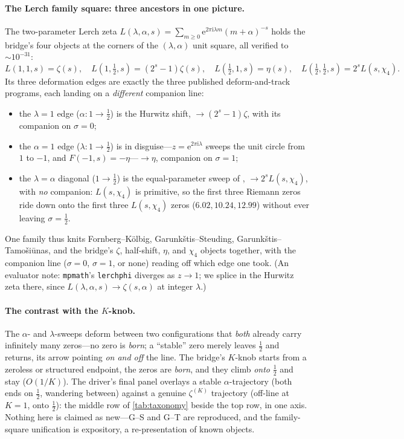 \documentclass[11pt]{article}
\theoremstyle{definition}
\newcommand{\eu}{\mathrm{e}}
\newcommand{\iu}{\mathrm{i}}
\begin{document}
\paragraph{The Lerch family square: three ancestors in one picture.}
The two-parameter Lerch zeta $L(\lambda,\alpha,s)=\sum_{m\ge0}\eu^{2\pi\iu\lambda
m}(m+\alpha)^{-s}$ holds the bridge's four objects at the corners of the
$(\lambda,\alpha)$ unit square, all verified to $\sim10^{-31}$:
\begin{equation}\label{eq:lerchcorners}
  L(1,1,s)=\zeta(s),\quad
  L(1,\tfrac12,s)=(2^{s}-1)\zeta(s),\quad
  L(\tfrac12,1,s)=\eta(s),\quad
  L(\tfrac12,\tfrac12,s)=2^{s}L(s,\chi_4).
\end{equation}
Its three deformation edges are exactly the three published deform-and-track
programs, each landing on a \emph{different} companion line:
\begin{itemize}[leftmargin=1.4em]
\item the $\lambda=1$ edge ($\alpha:1\to\tfrac12$) is the \citet{GarunkstisSteuding2007}
  Hurwitz shift, $\to(2^{s}-1)\zeta$, with its companion on $\sigma=0$;
\item the $\alpha=1$ edge ($\lambda:1\to\tfrac12$) is \citet{FornbergKolbig1975} in
  disguise---$z=\eu^{2\pi\iu\lambda}$ sweeps the unit circle from $1$ to $-1$, and
  $F(-1,s)=-\eta$---$\to\eta$, companion on $\sigma=1$;
\item the $\lambda=\alpha$ diagonal ($1\to\tfrac12$) is the equal-parameter sweep of
  \citet{GarunkstisTamosiunas2017}, $\to2^{s}L(s,\chi_4)$, with \emph{no} companion:
  $L(s,\chi_4)$ is primitive, so the first three Riemann zeros ride down onto the
  first three $L(s,\chi_4)$ zeros ($6.02,10.24,12.99$) without ever leaving
  $\sigma=\tfrac12$.
\end{itemize}
One family thus knits Fornberg--K\"olbig, Garunk\v{s}tis--Steuding,
Garunk\v{s}tis--Tamo\v{s}i\=unas, and the bridge's $\zeta$, half-shift, $\eta$, and
$\chi_4$ objects together, with the companion line ($\sigma=0$, $\sigma=1$, or none)
reading off which edge one took. (An evaluator note: \texttt{mpmath}'s
\texttt{lerchphi} diverges as $z\to1$; we splice in the Hurwitz zeta there, since
$L(\lambda,\alpha,s)\to\zeta(s,\alpha)$ at integer $\lambda$.)

\paragraph{The contrast with the $K$-knob.}
The $\alpha$- and $\lambda$-sweeps deform between two configurations that \emph{both}
already carry infinitely many zeros---no zero is \emph{born}; a ``stable'' zero merely
leaves $\tfrac12$ and returns, its arrow pointing \emph{on and off} the line. The
bridge's $K$-knob starts from a zeroless or structured endpoint, the zeros are
\emph{born}, and they climb \emph{onto} $\tfrac12$ and stay ($O(1/K)$). The driver's
final panel overlays a stable $\alpha$-trajectory (both ends on $\tfrac12$, wandering
between) against a genuine $\zeta^{(K)}$ trajectory (off-line at $K=1$, onto
$\tfrac12$): the middle row of \cref{tab:taxonomy} beside the top row, in one axis.
Nothing here is claimed as new---G--S and G--T are reproduced, and the family-square
unification is expository, a re-presentation of known objects.
\end{document}
